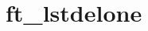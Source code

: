 \chapter{ft\+\_\+lstdelone}
\hypertarget{md_Documentation_2ft__lstdelone}{}\label{md_Documentation_2ft__lstdelone}
